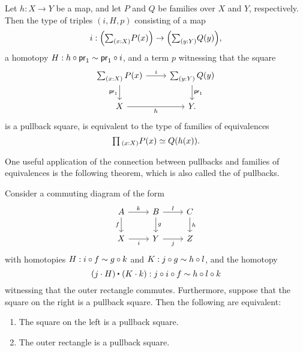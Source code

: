 \begin{cor}\label{cor:pb_fibequiv_complete}
Let $h:X\to Y$ be a map, and let $P$ and $Q$ be families over $X$ and $Y$, respectively.
Then the type of triples $(i,H,p)$ consisting of a map 
\begin{equation*}
i:\Big(\sm{x:X}P(x)\Big)\to \Big(\sm{y:Y}Q(y)\Big),
\end{equation*}
a homotopy $H:h\circ \mathsf{pr}_{1}\sim \mathsf{pr}_{1}\circ i$, and a term $p$ witnessing that the square
\begin{equation*}
\begin{tikzcd}
\sm{x:X}P(x) \arrow[d,swap,"\proj 1"] \arrow[r,"i"] & \sm{y:Y}Q(y) \arrow[d,"\proj 1"] \\
X \arrow[r,swap,"h"] & Y.
\end{tikzcd}
\end{equation*}
is a pullback square, is equivalent to the type of families of equivalences
\begin{equation*}
\prd{x:X}\eqv{P(x)}{Q(h(x))}.
\end{equation*}
\end{cor}

One useful application of the connection between pullbacks and families of equivalences is the following theorem, which is also called the  of pullbacks.

\begin{thm}\label{thm:pb_pasting}
Consider a commuting diagram of the form
\begin{equation*}
\begin{tikzcd}
A \arrow[r,"k"] \arrow[d,swap,"f"] & B \arrow[r,"l"] \arrow[d,"g"] & C \arrow[d,"h"] \\
X \arrow[r,swap,"i"] & Y \arrow[r,swap,"j"] & Z
\end{tikzcd}
\end{equation*}
with homotopies $H:i\circ f\sim g\circ k$ and $K:j\circ g\sim h\circ l$, and the homotopy
\begin{equation*}
\ct{(j\cdot H)}{(K\cdot k)}:j\circ i\circ f\htpy h\circ l\circ k
\end{equation*}
witnessing that the outer rectangle commutes. Furthermore, suppose that the square on the right is a pullback square. Then the following are equivalent:
\begin{samepage}%
\begin{enumerate}
\item The square on the left is a pullback square.
\item The outer rectangle is a pullback square.
\end{enumerate}%
\end{samepage}%
\end{thm}

